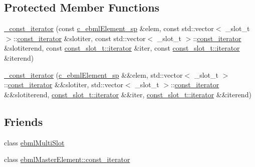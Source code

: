 \subsection*{Protected Member Functions}
\begin{DoxyCompactItemize}
\item 
\mbox{\hyperlink{classebml_1_1ebmlMultiSlot_1_1__const__iterator_a5b4e23f10ca68b3ada0101d6a085f48d}{\+\_\+const\+\_\+iterator}} (const \mbox{\hyperlink{namespaceebml_a2deef4e8071531b32e3533f1bf978917}{c\+\_\+ebml\+Element\+\_\+sp}} \&elem, const std\+::vector$<$ \+\_\+slot\+\_\+t $>$\+::\mbox{\hyperlink{classebml_1_1ebmlMasterElement_1_1const__iterator}{const\+\_\+iterator}} \&slotiter, const std\+::vector$<$ \+\_\+slot\+\_\+t $>$\+::\mbox{\hyperlink{classebml_1_1ebmlMasterElement_1_1const__iterator}{const\+\_\+iterator}} \&slotiterend, const \mbox{\hyperlink{classebml_1_1const__slot__t_1_1iterator}{const\+\_\+slot\+\_\+t\+::iterator}} \&iter, const \mbox{\hyperlink{classebml_1_1const__slot__t_1_1iterator}{const\+\_\+slot\+\_\+t\+::iterator}} \&iterend)
\item 
\mbox{\hyperlink{classebml_1_1ebmlMultiSlot_1_1__const__iterator_a681e9596c1ae982f3c482548cb16333d}{\+\_\+const\+\_\+iterator}} (\mbox{\hyperlink{namespaceebml_a2deef4e8071531b32e3533f1bf978917}{c\+\_\+ebml\+Element\+\_\+sp}} \&\&elem, std\+::vector$<$ \+\_\+slot\+\_\+t $>$\+::\mbox{\hyperlink{classebml_1_1ebmlMasterElement_1_1const__iterator}{const\+\_\+iterator}} \&\&slotiter, std\+::vector$<$ \+\_\+slot\+\_\+t $>$\+::\mbox{\hyperlink{classebml_1_1ebmlMasterElement_1_1const__iterator}{const\+\_\+iterator}} \&\&slotiterend, \mbox{\hyperlink{classebml_1_1const__slot__t_1_1iterator}{const\+\_\+slot\+\_\+t\+::iterator}} \&\&iter, \mbox{\hyperlink{classebml_1_1const__slot__t_1_1iterator}{const\+\_\+slot\+\_\+t\+::iterator}} \&\&iterend)
\end{DoxyCompactItemize}
\subsection*{Friends}
\begin{DoxyCompactItemize}
\item 
class \mbox{\hyperlink{classebml_1_1ebmlMultiSlot_1_1__const__iterator_ab14eb6c5a125d7276a7b4b5b6573428b}{ebml\+Multi\+Slot}}
\item 
class \mbox{\hyperlink{classebml_1_1ebmlMultiSlot_1_1__const__iterator_a734affd0f736e2e4e03ab2cf8a9f9b26}{ebml\+Master\+Element\+::const\+\_\+iterator}}
\end{DoxyCompactItemize}


